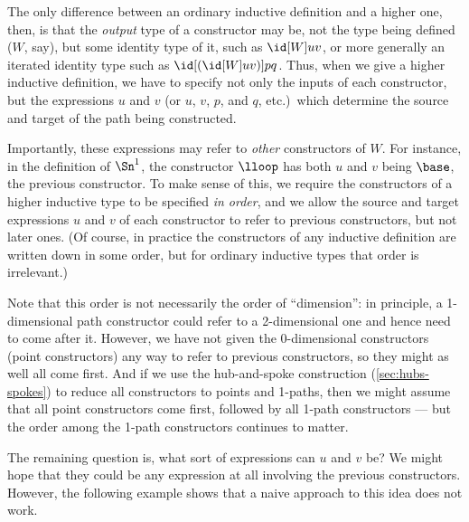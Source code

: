 The only difference between an ordinary inductive definition and a higher one, then, is that the \emph{output} type of a constructor may be, not the type being defined ($W$, say), but some identity type of it, such as $\id[W]uv$, or more generally an iterated identity type such as $\id[({\id[W]uv})]pq$.
Thus, when we give a higher inductive definition, we have to specify not only the inputs of each constructor, but the expressions $u$ and $v$ (or $u$, $v$, $p$, and $q$, etc.)\ which determine the source and target of the path being constructed.

Importantly, these expressions may refer to \emph{other} constructors of $W$.
For instance, in the definition of $\Sn^1$, the constructor $\lloop$ has both $u$ and $v$ being $\base$, the previous constructor.
To make sense of this, we require the constructors of a higher inductive type to be specified \emph{in order}, and we allow the source and target expressions $u$ and $v$ of each constructor to refer to previous constructors, but not later ones.
(Of course, in practice the constructors of any inductive definition are written down in some order, but for ordinary inductive types that order is irrelevant.)

Note that this order is not necessarily the order of ``dimension'': in principle, a 1-dimensional path constructor could refer to a 2-dimensional one and hence need to come after it.
However, we have not given the 0-dimensional constructors (point constructors) any way to refer to previous constructors, so they might as well all come first.
And if we use the hub-and-spoke construction (\cref{sec:hubs-spokes}) to reduce all constructors to points and 1-paths, then we might assume that all point constructors come first, followed by all 1-path constructors --- but the order among the 1-path constructors continues to matter.

The remaining question is, what sort of expressions can $u$ and $v$ be?
We might hope that they could be any expression at all involving the previous constructors.
However, the following example shows that a naive approach to this idea does not work.

